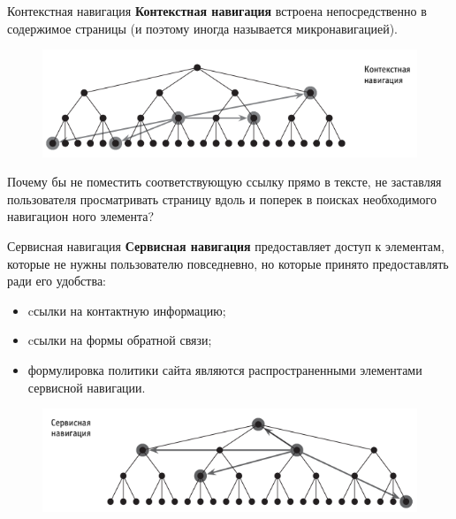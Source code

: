 \documentclass{beamer}
\begin{document}
\begin{frame}[t]{Контекстная навигация}
\textbf{Контекстная навигация} встроена непосредственно в содержимое страницы (и поэтому иногда называется микронавигацией). 
\begin{figure}[h]
\centering
\includegraphics[scale=0.5]{images/lec04-pic15.png}
\end{figure}
Почему бы не поместить соответствующую ссылку прямо в тексте, не заставляя пользователя просматривать страницу вдоль и поперек в поисках необходимого навигацион ного элемента?
\end{frame}

\begin{frame}[t]{Сервисная навигация}
\textbf{Сервисная навигация} предоставляет доступ к элементам, которые не нужны пользователю повседневно, но которые принято предоставлять ради его удобства:
\begin{itemize}
\item cсылки на контактную информацию; 
\item cсылки на формы обратной связи; 
\item формулировка политики сайта являются распространенными элементами сервисной навигации.
\end{itemize} 
\begin{figure}[h]
\centering
\includegraphics[scale=0.5]{images/lec04-pic16.png}
\end{figure}
\end{frame}
\end{document}
